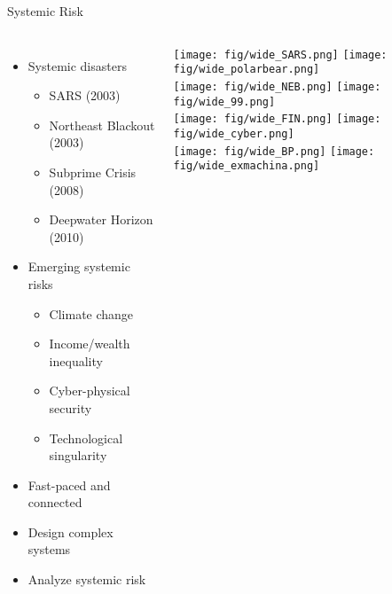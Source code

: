 \begin{frame}{Systemic Risk}\pause
\begin{columns}[c]
		\begin{itemize}[<+->]
		\item Systemic disasters
		\begin{itemize}
			\item SARS (2003)
			\item Northeast Blackout (2003)
			\item Subprime Crisis (2008)
			\item Deepwater Horizon
			(2010)
		\end{itemize}
		\item Emerging systemic risks
		\begin{itemize}
			\item Climate change
			\item Income/wealth inequality
			\item Cyber-physical security
			\item Technological singularity
		\end{itemize}
		\item Fast-paced and connected
		\item Design complex systems
		\item Analyze systemic risk
		\end{itemize}
	   \texttt{[image: fig/wide\_SARS.png]}
	   \onslide<8->
	   \texttt{[image: fig/wide\_polarbear.png]}\\%
	   \onslide<4->
	   \texttt{[image: fig/wide\_NEB.png]}
	   \onslide<9->
	   \texttt{[image: fig/wide\_99.png]}\\%
	   \onslide<5->
	   \texttt{[image: fig/wide\_FIN.png]}
	   \onslide<10->
	   \texttt{[image: fig/wide\_cyber.png]}\\%
	   \onslide<6->
	   \texttt{[image: fig/wide\_BP.png]}
	   \onslide<11->
	   \texttt{[image: fig/wide\_exmachina.png]}%
\end{columns}
\end{frame}
